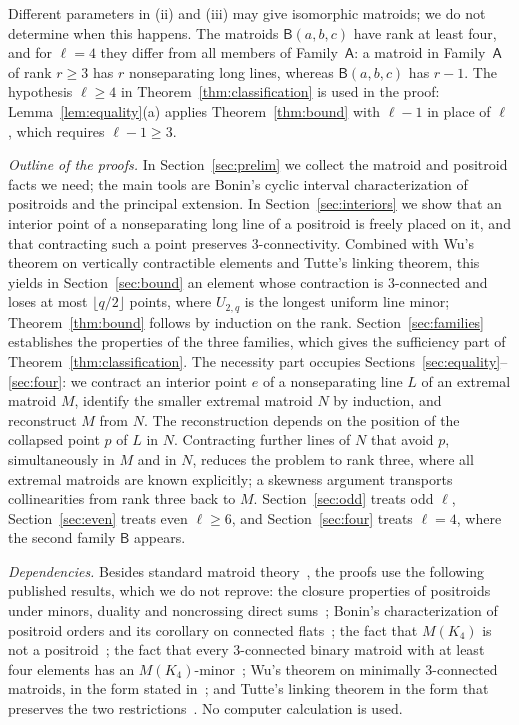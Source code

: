 \documentclass[11pt]{amsart}
\theoremstyle{definition}
\theoremstyle{remark}
\numberwithin{equation}{section}
\newcommand{\FA}{\mathsf{A}}
\newcommand{\FB}{\mathsf{B}}
\begin{document}
Different parameters in (ii) and (iii) may give isomorphic matroids; we do not determine when this happens. The matroids $\FB(a,b,c)$ have rank at least four, and for $\ell=4$ they differ from all members of Family~$\FA$: a matroid in Family~$\FA$ of rank $r\ge3$ has $r$ nonseparating long lines, whereas $\FB(a,b,c)$ has $r-1$. The hypothesis $\ell\ge4$ in Theorem~\ref{thm:classification} is used in the proof: Lemma~\ref{lem:equality}(a) applies Theorem~\ref{thm:bound} with $\ell-1$ in place of $\ell$, which requires $\ell-1\ge3$.

\emph{Outline of the proofs.} In Section~\ref{sec:prelim} we collect the matroid and positroid facts we need; the main tools are Bonin's cyclic interval characterization of positroids and the principal extension. In Section~\ref{sec:interiors} we show that an interior point of a nonseparating long line of a positroid is freely placed on it, and that contracting such a point preserves $3$-connectivity. Combined with Wu's theorem on vertically contractible elements and Tutte's linking theorem, this yields in Section~\ref{sec:bound} an element whose contraction is $3$-connected and loses at most $\lfloor q/2\rfloor$ points, where $U_{2,q}$ is the longest uniform line minor; Theorem~\ref{thm:bound} follows by induction on the rank. Section~\ref{sec:families} establishes the properties of the three families, which gives the sufficiency part of Theorem~\ref{thm:classification}. The necessity part occupies Sections~\ref{sec:equality}--\ref{sec:four}: we contract an interior point $e$ of a nonseparating line $L$ of an extremal matroid $M$, identify the smaller extremal matroid $N$ by induction, and reconstruct $M$ from $N$. The reconstruction depends on the position of the collapsed point $p$ of $L$ in $N$. Contracting further lines of $N$ that avoid $p$, simultaneously in $M$ and in $N$, reduces the problem to rank three, where all extremal matroids are known explicitly; a skewness argument transports collinearities from rank three back to $M$. Section~\ref{sec:odd} treats odd $\ell$, Section~\ref{sec:even} treats even $\ell\ge6$, and Section~\ref{sec:four} treats $\ell=4$, where the second family $\FB$ appears.

\emph{Dependencies.} Besides standard matroid theory~\cite{Oxl11}, the proofs use the following published results, which we do not reprove: the closure properties of positroids under minors, duality and noncrossing direct sums~\cite{ARW16}; Bonin's characterization of positroid orders and its corollary on connected flats~\cite[Theorem~3.2(4) and Corollary~3.4]{Bon24}; the fact that $M(K_4)$ is not a positroid~\cite[Section~3]{Bon24}; the fact that every $3$-connected binary matroid with at least four elements has an $M(K_4)$-minor~\cite[Corollary~12.2.13]{Oxl11}; Wu's theorem on minimally $3$-connected matroids, in the form stated in~\cite[Theorem~12.6]{Oxl96}; and Tutte's linking theorem in the form that preserves the two restrictions~\cite[Theorem~8.5.7]{Oxl11}. No computer calculation is used.
\end{document}
